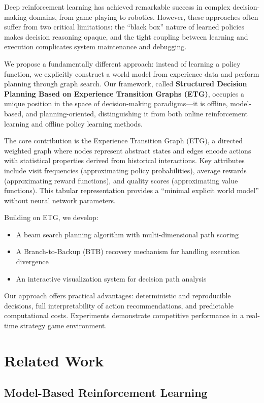 \documentclass[letterpaper]{article}
\begin{document}
Deep reinforcement learning has achieved remarkable success in complex decision-making domains, from game playing to robotics. However, these approaches often suffer from two critical limitations: the ``black box'' nature of learned policies makes decision reasoning opaque, and the tight coupling between learning and execution complicates system maintenance and debugging.

We propose a fundamentally different approach: instead of learning a policy function, we explicitly construct a world model from experience data and perform planning through graph search. Our framework, called \textbf{Structured Decision Planning Based on Experience Transition Graphs (ETG)}, occupies a unique position in the space of decision-making paradigms—it is offline, model-based, and planning-oriented, distinguishing it from both online reinforcement learning and offline policy learning methods.

The core contribution is the Experience Transition Graph (ETG), a directed weighted graph where nodes represent abstract states and edges encode actions with statistical properties derived from historical interactions. Key attributes include visit frequencies (approximating policy probabilities), average rewards (approximating reward functions), and quality scores (approximating value functions). This tabular representation provides a ``minimal explicit world model'' without neural network parameters.

Building on ETG, we develop:
\begin{itemize}
    \item A beam search planning algorithm with multi-dimensional path scoring
    \item A Branch-to-Backup (BTB) recovery mechanism for handling execution divergence
    \item An interactive visualization system for decision path analysis
\end{itemize}

Our approach offers practical advantages: deterministic and reproducible decisions, full interpretability of action recommendations, and predictable computational costs. Experiments demonstrate competitive performance in a real-time strategy game environment.

\section{Related Work}

\subsection{Model-Based Reinforcement Learning}
\end{document}
